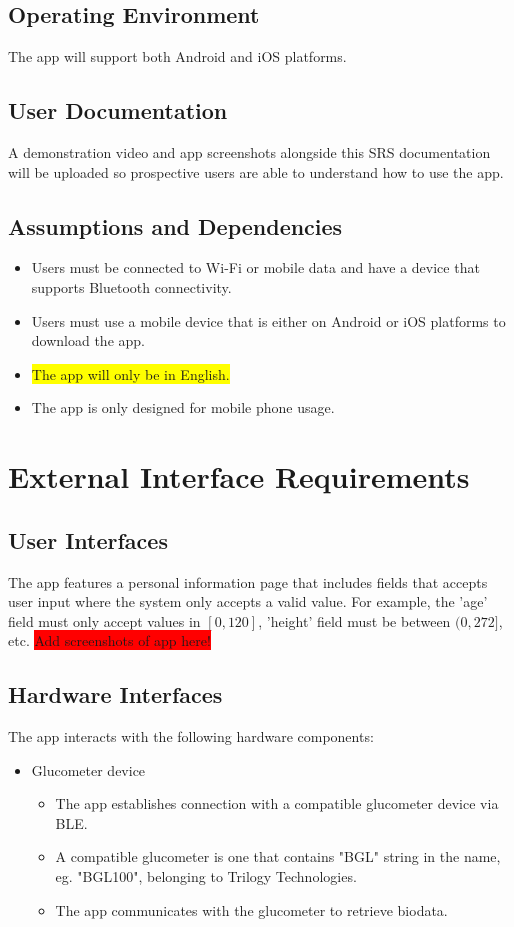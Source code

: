 \documentclass[a4paper]{scrreprt}
\begin{document}
\section{Operating Environment}
The app will support both Android and iOS platforms. 

\section{User Documentation}
A demonstration video and app screenshots alongside this SRS documentation will be uploaded so prospective users are able to understand how to use the app.

\section{Assumptions and Dependencies}
\begin{itemize}
    \item Users must be connected to Wi-Fi or mobile data and have a device that supports Bluetooth connectivity.
    \item Users must use a mobile device that is either on Android or iOS platforms to download the app.
    \item \colorbox{yellow}{The app will only be in English.}
    \item The app is only designed for mobile phone usage.
\end{itemize}

\chapter{External Interface Requirements}
\section{User Interfaces}
The app features a personal information page that includes fields that accepts user input where the system only accepts a valid value. For example, the 'age' field must only accept values in $[0, 120]$, 'height' field must be between $(0, 272]$, etc.
\newline
\newline
\colorbox{red}{Add screenshots of app here!}

\section{Hardware Interfaces}
The app interacts with the following hardware components:
\begin{itemize}
    \item Glucometer device
    \begin{itemize}
        \item The app establishes connection with a compatible glucometer device via BLE.
        \item A compatible glucometer is one that contains "BGL" string in the name, eg. "BGL100", belonging to Trilogy Technologies.
        \item The app communicates with the glucometer to retrieve biodata.
    \end{itemize}
\end{itemize}
\end{document}
